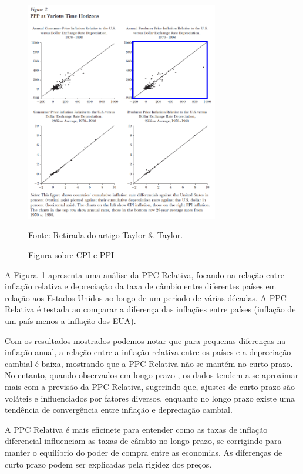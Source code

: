 \documentclass[a4paper,12pt]{article}[abntex2]
\begin{document}
\begin{figure}[H]
    \centering
    \caption{Figura sobre CPI e PPI} 
    \includegraphics[width=0.75\textwidth]{Macroeconomia Internacional/APS 3 Macro Int/PPCa & PPCr.png}
    \label{fig:ppcar}
    
    \footnotesize{Fonte: Retirada do artigo Taylor & Taylor.}
    \end{figure}

A Figura~\ref{fig:ppcar} apresenta uma análise da PPC Relativa, focando na relação entre inflação relativa e depreciação da taxa de câmbio entre diferentes países em relação aos Estados Unidos ao longo de um período de várias décadas. A PPC Relativa é testada ao comparar a diferença das inflações entre países (inflação de um país menos a inflação dos EUA).

Com os resultados mostrados podemos notar que para pequenas diferenças na inflação anual, a relação entre a inflação relativa entre os países e a depreciação cambial é baixa, mostrando que a PPC Relativa não se mantém no curto prazo. No entanto, quando observados em longo prazo , os dados tendem a se aproximar mais com a previsão da PPC Relativa, sugerindo que, ajustes de curto prazo são voláteis e influenciados por fatores diversos, enquanto no longo prazo existe uma tendência de convergência entre inflação e depreciação cambial.

A PPC Relativa é mais eficinete para entender como as taxas de inflação diferencial influenciam as taxas de câmbio no longo prazo, se corrigindo para manter o equilíbrio do poder de compra entre as economias. As diferenças de curto prazo podem ser explicadas pela rigidez dos preços.
\end{document}
